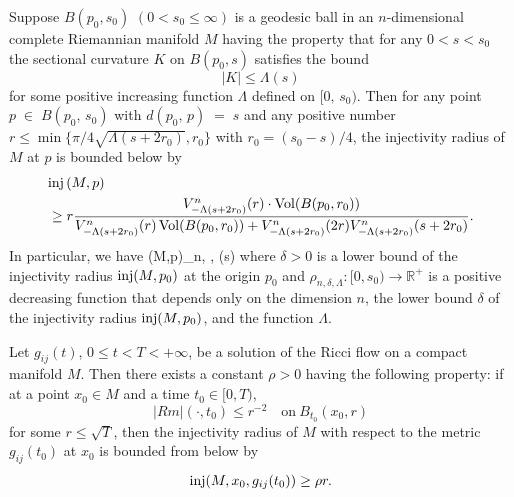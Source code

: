 \begin{corollary}
  \label{cor:cz-injectivity-radius-from-local-curvature-scale}
Suppose $B(p_0, s_0)$ $(0<s_0\le \infty)$ is a geodesic ball in an
$n$-dimensional complete Riemannian manifold $M$ having the
property that for any $0<s<s_0$ the sectional curvature $K$ on
$B(p_0, s)$ satisfies the bound
$$
|K|\le \Lambda(s)
$$
for\; some\; positive\; increasing\; function\; $\Lambda$\;
defined\; on\; $[0,\,s_0)$.\; Then\; for\; any\; point\; $p\;\in\;
B(p_0,\, s_0)$\; with\; $d(p_0,\, p)\;=\;s$\; and\; any\;
positive\; number $r\le \min\{\pi/4\sqrt{\Lambda(s+2r_0)},r_0\}$
with $r_0=(s_0-s)/4$, the injectivity radius of $M$ at $p$ is
bounded below by
\begin{align*}
& {\rm inj}\,(M,p) \\
&\geq r \frac{V^{n}_{-\Lambda(s+2r_0)}(r)\cdot
\operatorname{Vol}(B(p_0,r_0))}{V^{n}_{-\Lambda(s+2r_0)}(r)\operatorname{Vol}(B(p_0,r_0))+
V_{-\Lambda(s+2r_0)}^n(2r)V^{n}_{-\Lambda(s+2r_0)}(s+2r_0)}.
\end{align*}
In particular, we have \be
\inj(M,p)\geq \rho_{n, \delta, \Lambda}(s) %
\ee where $\delta>0$ is a lower bound of the injectivity radius
$\operatorname{inj}(M, p_0)$ at the origin $p_0$ and $\rho_{n,\delta, \Lambda}:
[0, s_0) \to \mathbb{R^+}$ is a positive decreasing function that
depends only on the dimension $n$, the lower bound $\delta$ of the
injectivity radius $\operatorname{inj}(M,p_0)$, and the function $\Lambda$.
\end{corollary}
\begin{theorem}
  \label{thm:cz-little-loop-lemma}
Let $g_{ij}(t)$, $0\le t<T<+\infty$, be a solution of the Ricci
flow on a compact manifold $M$. Then there exists a constant
$\rho>0$ having the following property: if at a point $x_0\in M$
and a time $t_0\in [0,T)$,
$$ |Rm|(\cdot,t_0)\leq r^{-2} \quad
\text{on}\ B_{t_0}(x_0,r)
$$
for some $r\leq \sqrt{T}$, then the injectivity radius of $M$ with
respect to the metric $g_{ij}(t_0)$ at $x_0$ is bounded from below
by
$$
\operatorname{inj}(M,x_0,g_{ij}(t_0))\geq \rho r.
$$
\end{theorem}
